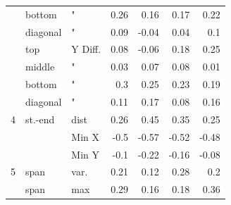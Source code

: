 \documentclass{sigchi}
\begin{document}
\begin{table}
\begin{tabular}{|lll|rrrr|}
    ~    & bottom & "         & 0.26  & 0.16   & 0.17   & 0.22  \\
    ~    & diagonal & "         & 0.09  & -0.04  & 0.04   & 0.1   \\
    ~    & top  & Y Diff.   & 0.08  & -0.06 & 0.18   & 0.25  \\
    ~    & middle  & "         & 0.03  & 0.07   & 0.08   & 0.01  \\
    ~    & bottom & "         & 0.3   & 0.25   & 0.23   & 0.19  \\
    ~    & diagonal & "         & 0.11  & 0.17   & 0.08   & 0.16  \\ \hline
    4    & st.-end   & dist      & 0.26  & 0.45   & 0.35   & 0.25  \\
    ~    & ~           & Min X     & -0.5  & \cellcolor[gray]{0.9}-0.57  & -0.52  & -0.48 \\
    ~    & ~           & Min Y     & -0.1  & -0.22  & -0.16  & -0.08 \\ \hline
    5    & span        & var.      & 0.21  & 0.12   & 0.28   & 0.2   \\
    ~    & span        & max       & 0.29  & 0.16   & 0.18   & \cellcolor[gray]{0.9}0.36  \\ \hline
    \end{tabular}
\end{table}
\end{document}
